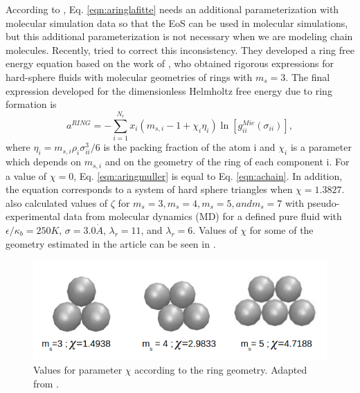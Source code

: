 	According to , Eq. \eqref{eqn:aringlafitte} needs an additional parameterization with molecular simulation data so that the EoS can  be used in molecular simulations, but this additional parameterization is not necessary when we are modeling chain molecules. Recently,  tried to correct this inconsistency. They developed a ring free energy equation based on the work of , who obtained rigorous expressions for hard-sphere fluids with molecular geometries of rings with $m_s=3$. The final expression developed for the dimensionless Helmholtz free energy due to ring formation is
	\begin{equation}
	a^{RING} =-\sum_{i=1}^{N_{c}} x_{i}\left (m_{s,i}-1+\chi_{i}\eta_{i} \right )\ln \left [g_{ii}^{Mie}(\sigma_{ii}) \right] ,
	\label{eqn:aringmuller}
	\end{equation}
	where $\eta_{i}=m_{s,i}\rho_{i}\sigma_{ii}^{3}/6$ is the packing fraction of the atom i and $\chi_{i}$ is a parameter which depends on $m_{s,i}$ and on the geometry of the ring of each component i. For a value of $\chi=0$, Eq. \eqref{eqn:aringmuller} is equal to Eq. \eqref{eqn:achain}. In addition, the equation corresponds to a system of hard sphere triangles when $\chi=1.3827$.  also calculated values of $\zeta$ for $m_{s}=3,m_{s}=4,m_{s}=5, and m_{s}=7$ with pseudo-experimental data from molecular dynamics (MD) for a defined pure fluid with $\epsilon/\kappa_{b} = 250 K$, $\sigma = 3.0 \dot{A}$, $\lambda_{r} = 11$, and $\lambda_{r} = 6$. Values of $\chi$  for some of the geometry estimated in the article can be seen in .
	\begin{figure}[th]
		\centering
		\includegraphics[scale=0.5]{Figures/mullergeo.png}
		\caption{Values for parameter $\chi$ according to the ring geometry. Adapted from .}
		\label{ringqsi}
	\end{figure}


